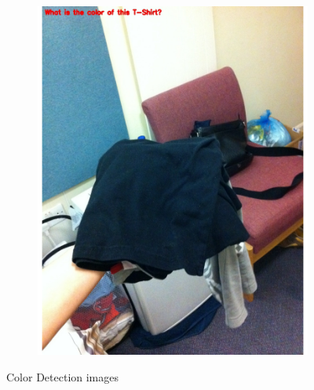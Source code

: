\documentclass[sigconf]{acmart}
\begin{document}
\begin{figure}[hbp]
\begin{subfigure}[b]{0.3\columnwidth}
                \includegraphics[width=\textwidth]{images/color_3.pdf}  
        \end{subfigure}%
        \caption{Color Detection images} 
        \label{fig:color}
\end{figure}
\end{document}
